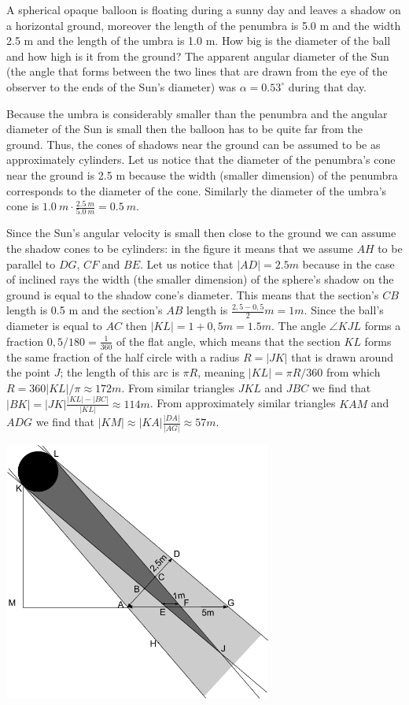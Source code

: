 A spherical opaque balloon is floating during a sunny day and leaves a shadow on a horizontal ground, moreover the length of the penumbra is 5.0 m and the width 2.5 m and the length of the umbra is 1.0 m. How big is the diameter of the ball and how high is it from the ground? The apparent angular diameter of the Sun (the angle that forms between the two lines that are drawn from the eye of the observer to the ends of the Sun’s diameter) was $\alpha =0.53^\circ$ during that day.

\hinteng
Because the umbra is considerably smaller than the penumbra and the angular diameter of the Sun is small then the balloon has to be quite far from the ground. Thus, the cones of shadows near the ground can be assumed to be as approximately cylinders. Let us notice that the diameter of the penumbra’s cone near the ground is 2.5 m because the width (smaller dimension) of the penumbra corresponds to the diameter of the cone. Similarly the diameter of the umbra’s cone is $\SI{1,0}{m}\cdot\frac{\SI{2,5}{m}}{\SI{5,0}{m}} = \SI{0,5}{m}$.

\solueng
Since the Sun's angular velocity is small then close to the ground we can assume the shadow cones to be cylinders: in the figure it means that we assume $AH$ to be parallel to $DG$, $CF$ and $BE$. Let us notice that $|AD|=\SI{2,5}m$ because in the case of inclined rays the width (the smaller dimension) of the sphere's shadow on the ground is equal to the shadow cone's diameter. This means that the section's $CB$ length is 0.5 m and the section's $AB$ length is $\frac{2,5-0,5}2\SI{}m=\SI{1}m$. Since the ball's diameter is equal to $AC$ then $|KL|=1+0,5\SI{}m=\SI{1,5}m$. The angle $\angle KJL$ forms a fraction $0,5/180=\frac 1{360}$ of the flat angle, which means that the section $KL$ forms the same fraction of the half circle with a radius $R=|JK|$ that is drawn around the point $J$; the length of this arc is $\pi R$, meaning $|KL|=\pi R /360$ from which $R=360|KL|/\pi\approx \SI{172}m$. From similar triangles $JKL$ and $JBC$ we find that $|BK|=|JK|\frac{|KL|-|BC|}{|KL|}\approx \SI{114}m$. From approximately similar triangles $KAM$ and $ADG$ we find that $|KM|\approx |KA|\frac{|DA|}{|AG|}\approx \SI{57}m$.
\begin{center}
\includegraphics[width=250pt]{2013-lahg-10-pxike-pall-vari}%
\end{center}
\probend
